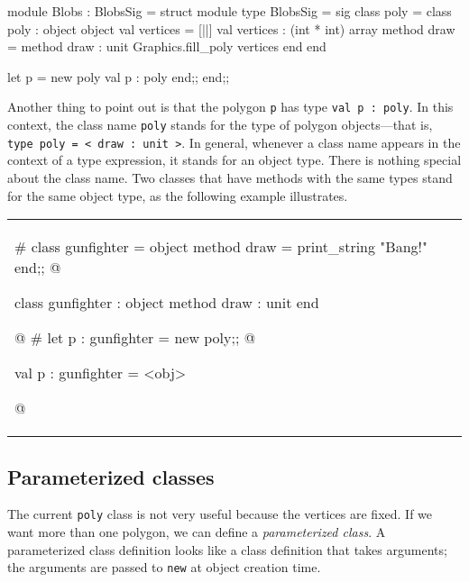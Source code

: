 \begin{ocaml}
module Blobs : BlobsSig = struct         module type BlobsSig = sig
   class poly =                             class poly : 
   object                                   object
      val vertices = [||]                      val vertices : (int * int) array
      method draw =                            method draw : unit
         Graphics.fill_poly vertices        end
   end

   let p = new poly                         val p : poly
end;;                                    end;;
\end{ocaml}
%
Another thing to point out is that the polygon \hbox{\lstinline/p/} has type \hbox{\lstinline/val p : poly/}.
In this context, the class name \hbox{\lstinline/poly/} stands for the type of polygon
objects---that is, \hbox{\lstinline/type poly = < draw : unit >/}.  In general, whenever a class name appears in
the context of a type expression, it stands for an object type.  There is nothing special about the
class name.  Two classes that have methods with the same types stand for the same object type, as the
following example illustrates.

\begin{tabular}{l}
\begin{ocaml}
# class gunfighter =
  object
     method draw = print_string "Bang!\n"
  end;;
@
\begin{topoutput}
class gunfighter : object method draw : unit end
\end{topoutput}
@
# let p : gunfighter = new poly;;
@
\begin{topoutput}
val p : gunfighter = <obj>
\end{topoutput}
@
\end{ocaml}
\end{tabular}

\subsection{Parameterized classes}

\label{classes:parameterized}
The current \hbox{\lstinline/poly/} class is not very useful because the vertices are fixed.  If we want
more than one polygon, we can define a \emph{parameterized class}.  A parameterized class definition
looks like a class definition that takes arguments; the arguments are passed to \hbox{\lstinline/new/} at
object creation time.


